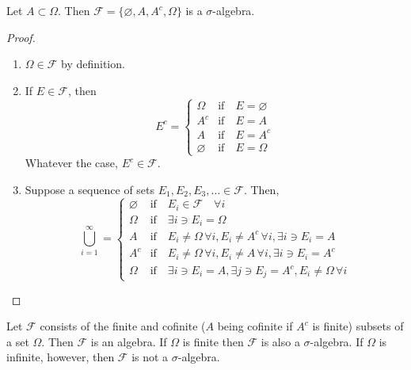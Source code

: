 \begin{example}
Let $A\subset \Omega$. Then $\mathcal F=\{\varnothing, A, A^c, \Omega \}$ is a $\sigma$-algebra.
\end{example}

\begin{proof}
\begin{enumerate}[label=\roman*.]
\item $\Omega\in \mathcal F$ by definition.
\item If $E\in \mathcal F$, then
\begin{equation*}
E^c=
\begin{cases}
\Omega & \text{if}\quad E=\varnothing\\
A^c & \text{if} \quad E=A\\
A & \text{if} \quad E=A^c\\
\varnothing & \text{if} \quad E=\Omega
\end{cases}
\end{equation*}
Whatever the case, $E^c\in \mathcal{F}$.
\item Suppose a sequence of sets $E_1, E_2, E_3,\ldots \in \mathcal{F}$. Then,
\begin{equation*}
\bigcup_{i=1}^\infty =
\begin{cases}
\varnothing & \text{if} \quad E_i\in\mathcal{F}\quad \forall i\\
\Omega & \text{if} \quad \exists i \ni E_i=\Omega\\
A & \text{if}\quad E_i\neq \Omega\, \forall i, E_i\neq A^c\, \forall i, \exists i \ni E_i=A\\
A^c & \text{if}\quad E_i\neq \Omega\, \forall i, E_i\neq A\, \forall i, \exists i\ni E_i=A^c\\
\Omega & \text{if}\quad \exists i \ni E_i=A, \exists j \ni E_j=A^c, E_i\neq \Omega\, \forall i
\end{cases}
\end{equation*}
\end{enumerate}
\end{proof}

\begin{example}
Let $\mathcal F$ consists of the finite and cofinite ($A$ being cofinite if $A^c$ is finite) 
subsets of a set $\Omega$. Then $\mathcal F$ is an algebra. If $\Omega$ is finite then $\mathcal F$
is also a $\sigma$-algebra. If $\Omega$ is infinite, however, then $\mathcal F$ is not a $\sigma$-algebra.
\end{example}

